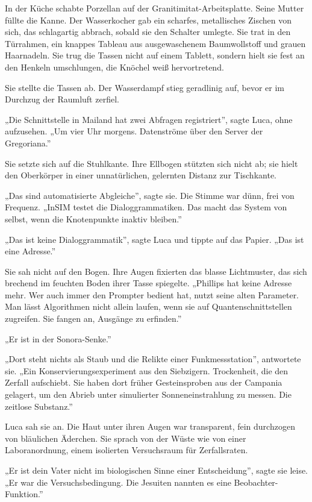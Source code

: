 \documentclass[
  ngerman,
]{article}
\begin{document}
In der Küche schabte Porzellan auf der Granitimitat-Arbeitsplatte. Seine
Mutter füllte die Kanne. Der Wasserkocher gab ein scharfes, metallisches
Zischen von sich, das schlagartig abbrach, sobald sie den Schalter
umlegte. Sie trat in den Türrahmen, ein knappes Tableau aus
ausgewaschenem Baumwollstoff und grauen Haarnadeln. Sie trug die Tassen
nicht auf einem Tablett, sondern hielt sie fest an den Henkeln
umschlungen, die Knöchel weiß hervortretend.

Sie stellte die Tassen ab. Der Wasserdampf stieg geradlinig auf, bevor
er im Durchzug der Raumluft zerfiel.

„Die Schnittstelle in Mailand hat zwei Abfragen registriert'', sagte
Luca, ohne aufzusehen. „Um vier Uhr morgens. Datenströme über den Server
der Gregoriana.''

Sie setzte sich auf die Stuhlkante. Ihre Ellbogen stützten sich nicht
ab; sie hielt den Oberkörper in einer unnatürlichen, gelernten Distanz
zur Tischkante.

„Das sind automatisierte Abgleiche'', sagte sie. Die Stimme war dünn,
frei von Frequenz. „InSIM testet die Dialoggrammatiken. Das macht das
System von selbst, wenn die Knotenpunkte inaktiv bleiben.''

„Das ist keine Dialoggrammatik'', sagte Luca und tippte auf das Papier.
„Das ist eine Adresse.''

Sie sah nicht auf den Bogen. Ihre Augen fixierten das blasse
Lichtmuster, das sich brechend im feuchten Boden ihrer Tasse spiegelte.
„Phillips hat keine Adresse mehr. Wer auch immer den Prompter bedient
hat, nutzt seine alten Parameter. Man lässt Algorithmen nicht allein
laufen, wenn sie auf Quantenschnittstellen zugreifen. Sie fangen an,
Ausgänge zu erfinden.''

„Er ist in der Sonora-Senke.''

„Dort steht nichts als Staub und die Relikte einer Funkmessstation'',
antwortete sie. „Ein Konservierungsexperiment aus den Siebzigern.
Trockenheit, die den Zerfall aufschiebt. Sie haben dort früher
Gesteinsproben aus der Campania gelagert, um den Abrieb unter
simulierter Sonneneinstrahlung zu messen. Die zeitlose Substanz.''

Luca sah sie an. Die Haut unter ihren Augen war transparent, fein
durchzogen von bläulichen Äderchen. Sie sprach von der Wüste wie von
einer Laboranordnung, einem isolierten Versuchsraum für Zerfallsraten.

„Er ist dein Vater nicht im biologischen Sinne einer Entscheidung'',
sagte sie leise. „Er war die Versuchsbedingung. Die Jesuiten nannten es
eine Beobachter-Funktion.''
\end{document}
